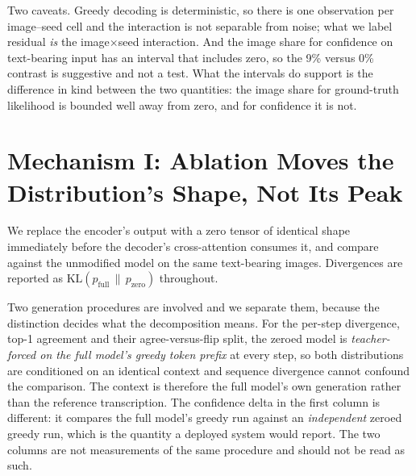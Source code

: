 \documentclass{article}
\begin{document}
Two caveats. Greedy decoding is deterministic, so there is one observation per image--seed cell
and the interaction is not separable from noise; what we label residual \emph{is} the
image$\times$seed interaction. And the image share for confidence on text-bearing input has an interval
that includes zero, so the 9\% versus 0\% contrast is suggestive and not a test. What the
intervals do support is the difference in kind between the two quantities: the image share for
ground-truth likelihood is bounded well away from zero, and for confidence it is not.

\section{Mechanism I: Ablation Moves the Distribution's Shape, Not Its Peak}
\label{sec:ablation}

We replace the encoder's output with a zero tensor of identical shape immediately before the
decoder's cross-attention consumes it, and compare against the unmodified model on the same
text-bearing images. Divergences are reported as $\mathrm{KL}(p_{\text{full}} \,\|\, p_{\text{zero}})$
throughout.

Two generation procedures are involved and we separate them, because the distinction decides
what the decomposition means. For the per-step divergence, top-1 agreement and their
agree-versus-flip split, the zeroed model is \emph{teacher-forced on the full model's greedy
token prefix} at every step, so both distributions are conditioned on an identical context and
sequence divergence cannot confound the comparison. The context is therefore the full model's
own generation rather than the reference transcription. The confidence delta in the first
column is different: it compares the full model's greedy run against an \emph{independent}
zeroed greedy run, which is the quantity a deployed system would report. The two columns are
not measurements of the same procedure and should not be read as such.
\end{document}
